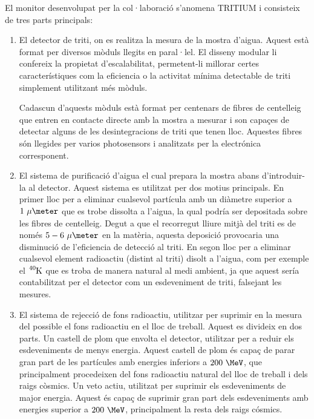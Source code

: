 El monitor desenvolupat per la col·laboració s'anomena TRITIUM i consisteix de tres parts principals:

\begin{enumerate}

\item{} El detector de triti, on es realitza la mesura de la mostra d'aigua. Aquest està format per diversos mòduls llegits en paral·lel. El disseny modular li confereix la propietat d'escalabilitat, permetent-li millorar certes característiques com la eficiencia o la activitat mínima detectable de triti simplement utilitzant més mòduls.

Cadascun d'aquests mòduls està format per centenars de fibres de centelleig que entren en contacte directe amb la mostra a mesurar i son capaçes de detectar alguns de les desintegracions de triti que tenen lloc. Aquestes fibres són llegides per varios photosensors i analitzats per la electrónica corresponent.

\item{} El sistema de purificació d'aigua el cual prepara la mostra abans d'introduir-la al detector. Aquest sistema es utilitzat per dos motius principals. En primer lloc per a eliminar cualsevol partícula amb un diàmetre superior a $1~\mu\meter$ que es trobe dissolta a l'aigua, la qual podría ser depositada sobre les fibres de centelleig. Degut a que el recorregut lliure mitjà del triti es de només $5-6~\mu\meter$ en la matèria, aquesta deposició provocaria una disminució de l'eficiencia de detecció al triti. En segon lloc per a eliminar cualsevol element radioactiu (distint al triti) disolt a l'aigua, com per exemple el $\ce{^{40}K}$ que es troba de manera natural al medi ambient, ja que aquest sería contabilitzat per el detector com un esdeveniment de triti, falsejant les mesures.

\item{} El sistema de rejecció de fons radioactiu, utilitzar per suprimir en la mesura del possible el fons radioactiu en el lloc de treball. Aquest es divideix en dos parts. Un castell de plom que envolta el detector, utilitzar per a reduir els esdeveniments de menys energia. Aquest castell de plom és capaç de parar gran part de les partícules amb energies inferiors a $200~\MeV$, que principalment procedeixen del fons radioactiu natural del lloc de treball i dels raigs còsmics. Un veto actiu, utilitzat per suprimir els esdeveniments de major energia. Aquest és capaç de suprimir gran part dels esdeveniments amb energies superior a $200~\MeV$, principalment la resta dels raigs cósmics.

\end{enumerate}


